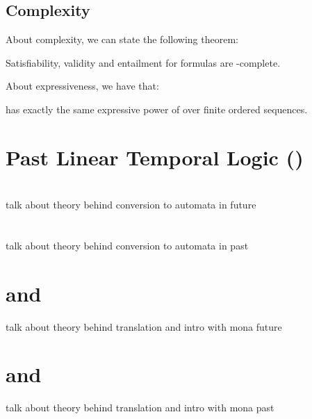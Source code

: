 \subsection{Complexity}
About \LTLf complexity, we can state the following theorem:
\begin{theorem}
Satisfiability, validity and entailment for \LTLf formulas are \PSPACE-complete.
\end{theorem}
\noindent About \LTLf expressiveness, we have that:
\begin{theorem}
\LTLf has exactly the same expressive power of \FOL over finite ordered sequences.
\end{theorem}
\section{Past Linear Temporal Logic (\PLTL)}
\section{\LTLfToDFA}
talk about theory behind conversion to automata in future
\section{\PLTLToDFA}
talk about theory behind conversion to automata in past
\section{\LTLfToFOL and \MONA}
talk about theory behind translation and intro with mona future
\section{\PLTLToFOL and \MONA}
talk about theory behind translation and intro with mona past
